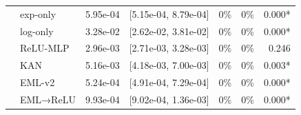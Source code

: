 \begin{table}[t]
\begin{tabular}{llrrrrr}
 & exp-only & 5.95e-04 & [5.15e-04, 8.79e-04] & 0\% & 0\% & 0.000* \\
 & log-only & 3.28e-02 & [2.62e-02, 3.81e-02] & 0\% & 0\% & 0.000* \\
 & ReLU-MLP & 2.96e-03 & [2.71e-03, 3.28e-03] & 0\% & 0\% & 0.246 \\
 & KAN & 5.16e-03 & [4.18e-03, 7.00e-03] & 0\% & 0\% & 0.003* \\
 & EML-v2 & 5.24e-04 & [4.91e-04, 7.29e-04] & 0\% & 0\% & 0.000* \\
 & EML→ReLU & 9.93e-04 & [9.02e-04, 1.36e-03] & 0\% & 0\% & 0.000* \\
\bottomrule
\end{tabular}
\end{table}